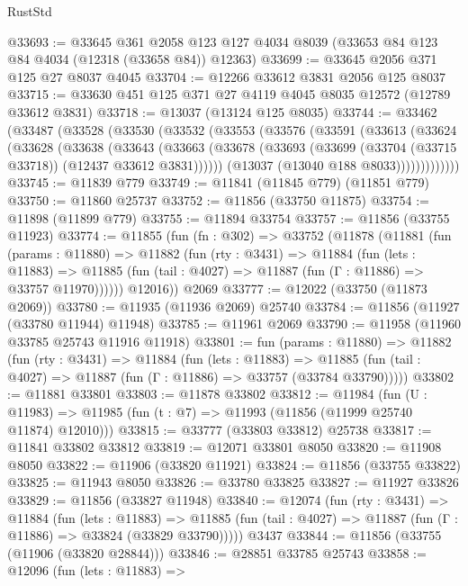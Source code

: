 \begin{lexlean}{RustStd}
\begin{coremodule}
@33693 := @33645
    @361
    @2058
    @123
    @127
    @4034
    @8039
    (@33653 @84 @123 @84 @4034 (@12318 (@33658 @84)) @12363)
@33699 := @33645 @2056 @371 @125 @27 @8037 @4045
@33704 := @12266 @33612 @3831 @2056 @125 @8037
@33715 := @33630 @451 @125 @371 @27 @4119 @4045 @8035 @12572 (@12789 @33612 @3831)
@33718 := @13037 (@13124 @125 @8035)
@33744 := @33462
    (@33487
      (@33528
        (@33530
          (@33532
            (@33553
              (@33576
                (@33591
                  (@33613
                    (@33624
                      (@33628
                        (@33638
                          (@33643
                            (@33663
                              (@33678
                                (@33693 (@33699 (@33704 (@33715 @33718)) (@12437 @33612 @3831))))))
                          (@13037 (@13040 @188 @8033)))))))))))))
@33745 := @11839 @779
@33749 := @11841 (@11845 @779) (@11851 @779)
@33750 := @11860 @25737
@33752 := @11856 (@33750 @11875)
@33754 := @11898 (@11899 @779)
@33755 := @11894 @33754
@33757 := @11856 (@33755 @11923)
@33774 := @11855
    (fun (fn : @302) =>
    @33752
      (@11878
        (@11881
          (fun (params : @11880) =>
          @11882
            (fun (rty : @3431) =>
            @11884
              (fun (lets : @11883) =>
              @11885 (fun (tail : @4027) => @11887 (fun (Γ : @11886) => @33757 @11970))))))
        @12016))
    @2069
@33777 := @12022 (@33750 (@11873 @2069))
@33780 := @11935 (@11936 @2069) @25740
@33784 := @11856 (@11927 (@33780 @11944) @11948)
@33785 := @11961 @2069
@33790 := @11958 (@11960 @33785 @25743 @11916 @11918)
@33801 := fun (params : @11880) =>
  @11882
    (fun (rty : @3431) =>
    @11884
      (fun (lets : @11883) =>
      @11885 (fun (tail : @4027) => @11887 (fun (Γ : @11886) => @33757 (@33784 @33790)))))
@33802 := @11881 @33801
@33803 := @11878 @33802
@33812 := @11984
    (fun (U : @11983) => @11985 (fun (t : @7) => @11993 (@11856 (@11999 @25740 @11874) @12010)))
@33815 := @33777 (@33803 @33812) @25738
@33817 := @11841 @33802 @33812
@33819 := @12071 @33801 @8050
@33820 := @11908 @8050
@33822 := @11906 (@33820 @11921)
@33824 := @11856 (@33755 @33822)
@33825 := @11943 @8050
@33826 := @33780 @33825
@33827 := @11927 @33826
@33829 := @11856 (@33827 @11948)
@33840 := @12074
    (fun (rty : @3431) =>
    @11884
      (fun (lets : @11883) =>
      @11885 (fun (tail : @4027) => @11887 (fun (Γ : @11886) => @33824 (@33829 @33790)))))
    @3437
@33844 := @11856 (@33755 (@11906 (@33820 @28844)))
@33846 := @28851 @33785 @25743
@33858 := @12096
    (fun (lets : @11883) =>

\end{coremodule}
\end{lexlean}
